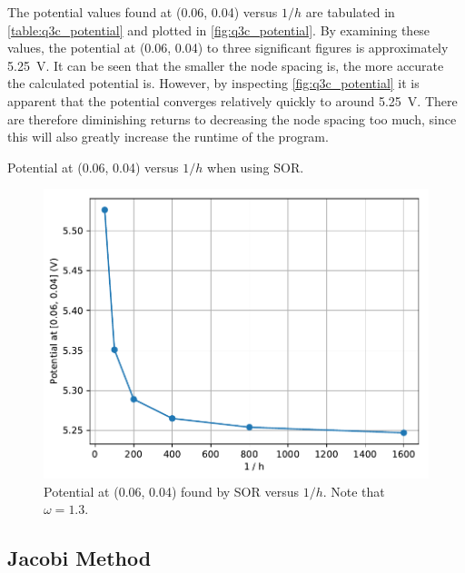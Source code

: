\documentclass[a4paper,titlepage]{article}
\begin{document}
	The potential values found at (0.06, 0.04) versus $1/h$ are tabulated in \autoref{table:q3c_potential} and plotted in \autoref{fig:q3c_potential}. By examining these values, the potential at (0.06, 0.04) to three significant figures is approximately \SI{5.25}{\volt}. It can be seen that the smaller the node spacing is, the more accurate the calculated potential is. However, by inspecting \autoref{fig:q3c_potential} it is apparent that the potential converges relatively quickly to around \SI{5.25}{\volt}. There are therefore diminishing returns to decreasing the node spacing too much, since this will also greatly increase the runtime of the program.

	\begin{table}[!htb]
		\centering
		\caption{Potential at (0.06, 0.04) versus $1/h$ when using SOR.}
		\label{table:q3c_potential}
	\end{table}

	\begin{figure}[!htb]
		\centering
		\includegraphics[width=\columnwidth]{plots/q3c_potential.pdf}
		\caption
		{Potential at (0.06, 0.04) found by SOR versus $1/h$. Note that $\omega=1.3$.}
		\label{fig:q3c_potential}
	\end{figure}
	
	\subsection{Jacobi Method}
	
\end{document}

